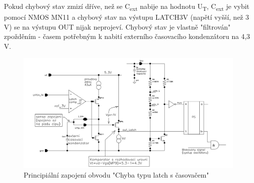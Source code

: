 Pokud chybový stav zmizí dříve, než se C\textsubscript{ext} nabije na hodnotu U\textsubscript{T}, C\textsubscript{ext} je vybit pomocí NMOS MN11 a chybový stav na výstupu LATCH3V (napětí vyšší, než 3 V) se na výstupu OUT nijak neprojeví. Chybový stav je vlastně "filtrován" zpožděním - časem potřebným k nabití externího časovacího kondenzátoru na 4,3 V.

\begin{figure}[h]
   \begin{center}
     \includegraphics[scale=0.5]{images/Latch2.png}
   \end{center}
   \caption{Principiální zapojení obvodu "Chyba typu latch s časovačem"}
\end{figure}